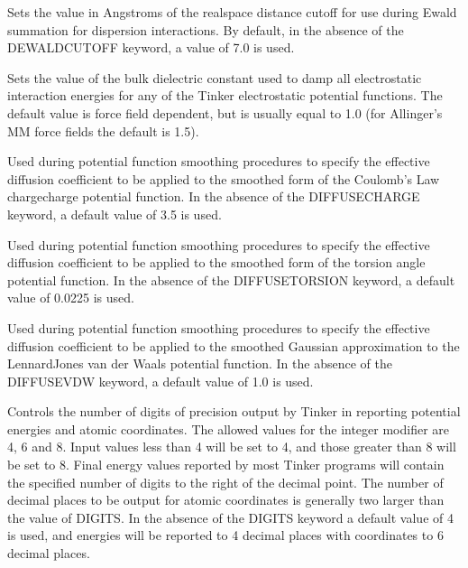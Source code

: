 \documentclass[letterpaper,11pt,english]{sphinxmanual}
\begin{document}
  Sets the value in Angstroms of the real\sphinxhyphen{}space distance cutoff for use during Ewald summation for dispersion interactions. By default, in the absence of the DEWALD\sphinxhyphen{}CUTOFF keyword, a value of 7.0 is used.

  Sets the value of the bulk dielectric constant used to damp all electrostatic interaction energies for any of the Tinker electrostatic potential functions. The default value is force field dependent, but is usually equal to 1.0 (for Allinger’s MM force fields the default is 1.5).


  Used during potential function smoothing procedures to specify the effective diffusion coefficient to be applied to the smoothed form of the Coulomb’s Law charge\sphinxhyphen{}charge potential function. In the absence of the DIFFUSE\sphinxhyphen{}CHARGE keyword, a default value of 3.5 is used.

  Used during potential function smoothing procedures to specify the effective diffusion coefficient to be applied to the smoothed form of the torsion angle potential function. In the absence of the DIFFUSE\sphinxhyphen{}TORSION keyword, a default value of 0.0225 is used.

  Used during potential function smoothing procedures to specify the effective diffusion coefficient to be applied to the smoothed Gaussian approximation to the Lennard\sphinxhyphen{}Jones van der Waals potential function. In the absence of the DIFFUSE\sphinxhyphen{}VDW keyword, a default value of 1.0 is used.

  Controls the number of digits of precision  output by Tinker in reporting potential energies and atomic coordinates. The allowed values for the integer modifier are 4, 6 and 8. Input values less than 4 will be set to 4, and those greater than 8 will be set to 8. Final energy values reported by most Tinker programs will contain the specified number of digits to the right of the decimal point. The number of decimal places to be output for atomic coordinates is generally two larger than the value of DIGITS. In the absence of the DIGITS keyword a default value of 4 is used, and  energies will be reported to 4 decimal places with coordinates to 6 decimal places.
\end{document}
